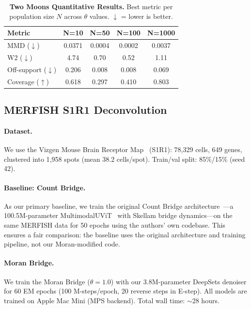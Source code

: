 \documentclass[11pt]{article}
\begin{document}
\begin{table}[ht]
\centering
\caption{\textbf{Two Moons Quantitative Results.} Best metric per population size $N$ across $\theta$ values. $\downarrow$ = lower is better.}
\label{tab:two_moons}
\vspace{4pt}
\begin{tabular}{l cccc}
\toprule
\textbf{Metric} & \textbf{N=10} & \textbf{N=50} & \textbf{N=100} & \textbf{N=1000} \\
\midrule
MMD ($\downarrow$)        & 0.0371 & 0.0004 & 0.0002 & 0.0037 \\
W2 ($\downarrow$)         & 4.74   & 0.70   & 0.52   & 1.11   \\
Off-support ($\downarrow$) & 0.206  & 0.008  & 0.008  & 0.069  \\
Coverage ($\uparrow$)      & 0.618  & 0.297  & 0.410  & 0.803  \\
\bottomrule
\end{tabular}
\end{table}

\subsection{MERFISH S1R1 Deconvolution}
\label{sec:merfish}

\paragraph{Dataset.}
We use the Vizgen Mouse Brain Receptor Map~\citep{vizgen2021merfish} (S1R1): 78{,}329 cells, 649 genes, clustered into 1{,}958 spots (mean 38.2 cells/spot). Train/val split: 85\%/15\% (seed 42).

\paragraph{Baseline: Count Bridge.}
As our primary baseline, we train the original Count Bridge architecture~\citep{fishman2025count}---a 100.5M-parameter MultimodalUViT~\citep{bao2023uvit} with Skellam bridge dynamics---on the same MERFISH data for 50 epochs using the authors' own codebase. This ensures a fair comparison: the baseline uses the original architecture and training pipeline, not our Moran-modified code.

\paragraph{Moran Bridge.}
We train the Moran Bridge ($\theta = 1.0$) with our 3.8M-parameter DeepSets denoiser for 60 EM epochs (100 M-steps/epoch, 20 reverse steps in E-step). All models are trained on Apple Mac Mini (MPS backend). Total wall time: ${\sim}$28 hours.
\end{document}
